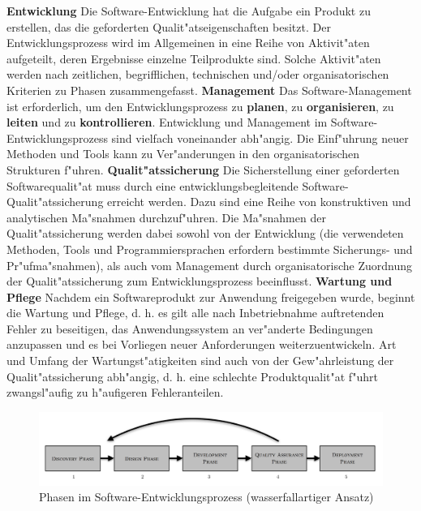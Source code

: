 \textbf{Entwicklung}
\newline
Die Software-Entwicklung hat die Aufgabe ein Produkt zu erstellen, das die geforderten Qualit"atseigenschaften besitzt. Der Entwicklungsprozess wird im Allgemeinen in eine Reihe von Aktivit"aten aufgeteilt, deren Ergebnisse einzelne Teilprodukte sind. Solche Aktivit"aten werden nach zeitlichen, begrifflichen, technischen und/oder organisatorischen Kriterien zu Phasen zusammengefasst.
\smallbreak
\textbf{Management}
\newline
Das Software-Management ist erforderlich, um den Entwicklungsprozess zu \textbf{planen}, zu \textbf{organisieren}, zu \textbf{leiten} und zu \textbf{kontrollieren}. Entwicklung und Management im Software-Entwicklungsprozess sind vielfach voneinander abh"angig. Die Einf"uhrung neuer Methoden und Tools kann zu Ver"anderungen in den organisatorischen Strukturen f"uhren.
\smallbreak
\textbf{Qualit"atssicherung}
\newline
Die Sicherstellung einer geforderten Softwarequalit"at muss durch eine entwicklungsbegleitende Software-Qualit"atssicherung erreicht werden. Dazu sind eine Reihe von konstruktiven und analytischen Ma"snahmen durchzuf"uhren. Die Ma"snahmen der Qualit"atssicherung werden dabei sowohl von der Entwicklung (die verwendeten Methoden, Tools und Programmiersprachen erfordern bestimmte Sicherungs- und Pr"ufma"snahmen), als auch vom Management durch organisatorische Zuordnung der Qualit"atssicherung zum Entwicklungsprozess beeinflusst.
\smallbreak
\textbf{Wartung und Pflege}
\newline
Nachdem ein Softwareprodukt zur Anwendung freigegeben wurde, beginnt die Wartung und Pflege, d. h. es gilt alle nach Inbetriebnahme auftretenden Fehler zu beseitigen, das Anwendungssystem an ver"anderte Bedingungen anzupassen und es bei Vorliegen neuer Anforderungen weiterzuentwickeln. Art und Umfang der Wartungst"atigkeiten sind auch von der Gew"ahrleistung der Qualit"atssicherung abh"angig, d. h. eine schlechte Produktqualit"at f"uhrt zwangsl"aufig zu h"aufigeren Fehleranteilen.

\newpage
\begin{figure}[H]
  \centering
  \includegraphics[width=1\textwidth]{./images/Softwarezyklus.png}
  \captionsetup{name=Abb.,font=footnotesize}
  \caption{Phasen im Software-Entwicklungsprozess (wasserfallartiger Ansatz)}
\end{figure}

